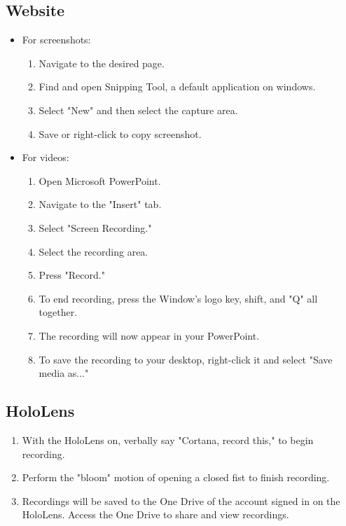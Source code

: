 \subsection{Website}
\begin{itemize}
    \item For screenshots:
    \begin{enumerate}
        \item Navigate to the desired page. 
        \item Find and open Snipping Tool, a default application on windows. 
        \item Select "New" and then select the capture area. 
        \item Save or right-click to copy screenshot. 
    \end{enumerate}
    \item For videos:
    \begin{enumerate}
        \item Open Microsoft PowerPoint.
        \item Navigate to the "Insert" tab. 
        \item Select "Screen Recording." 
        \item Select the recording area.
        \item Press "Record."
        \item To end recording, press the Window's logo key, shift, and "Q" all together.
        \item The recording will now appear in your PowerPoint. 
        \item To save the recording to your desktop, right-click it and select "Save media as..."
    \end{enumerate}
\end{itemize}

\subsection{HoloLens}
\begin{enumerate}
    \item With the HoloLens on, verbally say "Cortana, record this," to begin recording.
    \item Perform the "bloom" motion of opening a closed fist to finish recording.
	\item Recordings will be saved to the One Drive of the account signed in on the HoloLens. Access the One Drive to share and view recordings. 
\end{enumerate}

